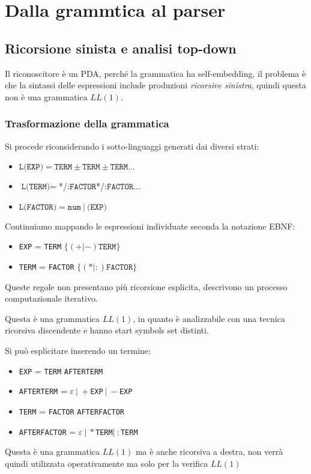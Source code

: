 \section{Dalla grammtica al parser}
\subsection{Ricorsione sinista e analisi top-down}
Il riconoscitore è un PDA, perché la grammatica ha self-embedding, il problema è che la sintassi delle espressioni include produzioni \textit{ricorsive sinistra}, quindi questa non è una grammatica $LL(1)$.

\subsubsection{Trasformazione della grammatica}
Si procede riconsiderando i sotto-linguaggi generati dai diversi strati:
\begin{itemize}[label={}]
    \item $\texttt{L(EXP)} = \texttt{TERM} \pm \texttt{TERM} \pm \texttt{TERM} \dots$
    \item $\texttt{L(TERM)} = $*/:$ \texttt{FACTOR} $*/:$ \texttt{FACTOR} \dots$
    \item $\texttt{L(FACTOR)} = \texttt{num}\ |\ \texttt{(EXP)}$
\end{itemize}
\setlist{}

Continuiamo mappando le espressioni individuate seconda la notazione EBNF:
\begin{itemize}[label={}]
    \item \texttt{EXP} = \texttt{TERM} $\{(+ | -) \texttt{TERM}\}$
    \item \texttt{TERM} = \texttt{FACTOR} $\{(* | :) \texttt{FACTOR}\}$
\end{itemize}
\setlist{}
Queste regole non presentano più ricorsione esplicita, descrivono un processo computazionale iterativo.

Questa è una grammatica $LL(1)$, in quanto è analizzabile con una tecnica ricorsiva discendente e hanno start symbols set distinti.

Si può esplicitare inserendo un termine:
\begin{itemize}[label={}]
    \item \texttt{EXP} = \texttt{TERM} \texttt{AFTERTERM}
    \item \texttt{AFTERTERM} = $\varepsilon\ |\ +$\texttt{EXP}$\ |\ -$\texttt{EXP} 
    \item \texttt{TERM} = \texttt{FACTOR} \texttt{AFTERFACTOR}
    \item \texttt{AFTERFACTOR} = $\varepsilon\ |\ *$\texttt{TERM}$|\ :$\texttt{TERM}
\end{itemize}
\setlist{}
Questa è una grammatica $LL(1)$ ma è anche ricorsiva a destra, non verrà quindi utilizzata operativamente ma solo per la verifica $LL(1)$

